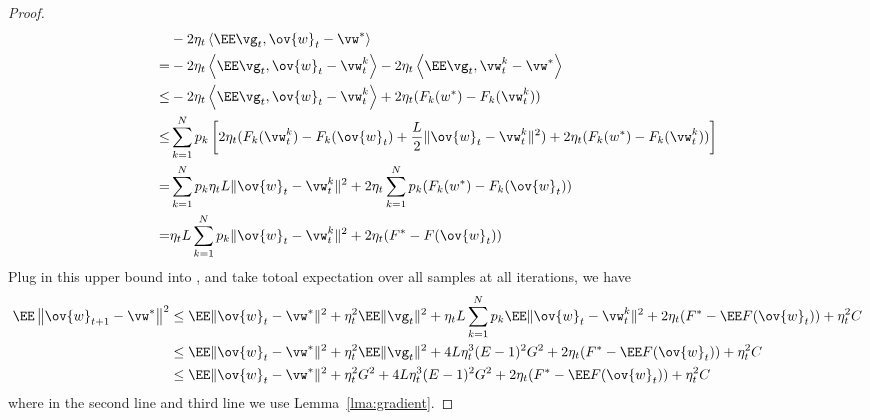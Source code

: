 \begin{proof}
\begin{align*}
	& -2 \eta_{t} \left<\EE \vg_{t}, \ov{w}_{t}-\vw^{*}\right> \\
 =  & -2 \eta_{t} \left<\EE \vg_{t}, \ov{w}_{t}- \vw^{k}_t \right> -2 \eta_{t} \left<\EE \vg_{t}, \vw^{k}_t - \vw^{*}\right>\\
 \leq & -2 \eta_{t} \left<\EE \vg_{t}, \ov{w}_{t}- \vw^{k}_t \right> + 2 \eta_{t} (F_k(w^*) - F_k(\vw^{k}_t))\\
 \leq &\sum_{k=1}^N p_k \left[2 \eta_{t} (F_k(\vw^{k}_t) - F_k(\ov{w}_t) + \frac{L}{2} \|\ov{w}_t - \vw^{k}_t\|^2 ) + 2 \eta_{t} (F_k(w^*) - F_k(\vw^{k}_t))\right]\\
 = & \sum_{k=1}^N p_k \eta_t L \|\ov{w}_t - \vw^{k}_t\|^2 + 2 \eta_{t} \sum_{k=1}^N p_k (F_k(w^*) - F_k(\ov{w}_t))\\
 = &  \eta_t L \sum_{k=1}^N p_k \|\ov{w}_t - \vw^{k}_t\|^2 + 2 \eta_{t} (F^* - F(\ov{w}_t))
\end{align*}
Plug in this upper bound into \eq{\ref{eq:expandsgd}}, \eq{\ref{eq:sgdcvxsmth1}} and take totoal expectation over all samples at all iterations, we have
\begin{align}
\EE\left\|\ov{w}_{t+1}-\vw^{*}\right\|^2 &\leq \EE\|\ov{w}_{t}-\vw^{*}\|^{2}+\eta_{t}^{2} \EE\| \vg_{t} \|^{2} + \eta_t L \sum_{k=1}^N p_k \EE \|\ov{w}_t - \vw^{k}_t\|^2 + 2 \eta_{t} (F^* - \EE F(\ov{w}_t)) + \eta_t^2 C\\
&\leq\EE \|\ov{w}_{t}-\vw^{*}\|^{2}+\eta_{t}^{2} \EE\| \vg_{t} \|^{2} +  4L\eta_t^3(E-1)^2 G^2 + 2 \eta_{t} (F^* - \EE F(\ov{w}_t)) + \eta_t^2 C\\
&\leq \EE\|\ov{w}_{t}-\vw^{*}\|^{2}+\eta_{t}^{2} G^2 +  4L\eta_t^3(E-1)^2 G^2 + 2 \eta_{t} (F^* - \EE F(\ov{w}_t))+\eta_t^2 C \label{eq:cvxsgd1}
\end{align}
where in the second line and third line we use Lemma~\ref{lma:gradient}.


\end{proof}
